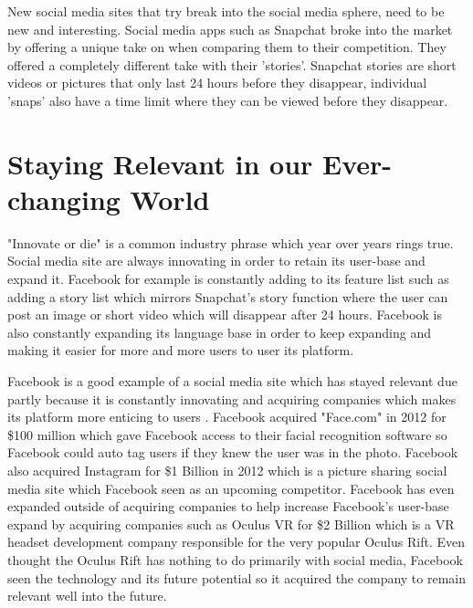 New social media sites that try break into the social media sphere, need to be new and interesting. Social media apps such as Snapchat broke into the market by offering a unique take on when comparing them to their competition. They offered a completely different take with their 'stories'. Snapchat stories are short videos or pictures that only last 24 hours before they disappear, individual 'snaps' also have a time limit where they can be viewed before they disappear.

\section{Staying Relevant in our Ever-changing World} 
"Innovate or die" is a common industry phrase which year over years rings true. Social media site are always innovating in order to retain its user-base and expand it. Facebook for example is constantly adding to its feature list such as adding a story list which mirrors Snapchat's story function where the user can post an image or short video which will disappear after 24 hours. Facebook is also constantly expanding its language base in order to keep expanding and making it easier for more and more users to user its platform. 

Facebook is a good example of a social media site which has stayed relevant due partly because it is constantly innovating and acquiring companies which makes its platform more enticing to users \cite{svatovsova2012social}. Facebook acquired "Face.com" in 2012 for \$100 million which gave Facebook access to their facial recognition software so Facebook could auto tag users if they knew the user was in the photo. Facebook also acquired Instagram for \$1 Billion in 2012 which is a picture sharing social media site which Facebook seen as an upcoming competitor. Facebook has even expanded outside of acquiring companies to help increase Facebook's user-base expand by acquiring companies such as Oculus VR for \$2 Billion which is a VR headset development company responsible for the very popular Oculus Rift. Even thought the Oculus Rift has nothing to do primarily with social media, Facebook seen the technology and its future potential so it acquired the company to remain relevant well into the future.
